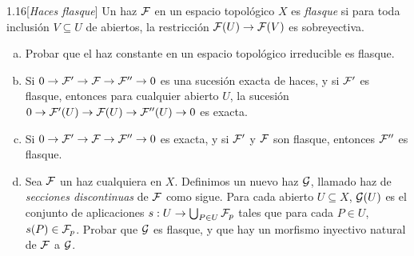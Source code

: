 \documentclass[twoside]{article}
\begin{document}
\newpage

\begin{ejercicio}{1.16}[\emph{Haces flasque}]
Un haz $\mathcal{F}$ en un espacio topológico $X$ es \emph{flasque} si para toda inclusión $V\subseteq U$ de abiertos, la restricción $\mathcal{F}(U)\to\mathcal{F}(V)$ es sobreyectiva.
\begin{enumerate}[(a)]
\item Probar que el haz constante en un espacio topológico irreducible es flasque.
\item Si $0\to\mathcal{F}'\to\mathcal{F}\to\mathcal{F}''\to 0$ es una sucesión exacta de haces, y si $\mathcal{F}'$ es flasque, entonces para cualquier abierto $U$, la sucesión $0\to\mathcal{F}'(U)\to\mathcal{F}(U)\to\mathcal{F}''(U)\to 0$ es exacta. 
\item Si $0\to\mathcal{F}'\to\mathcal{F}\to\mathcal{F}''\to 0$ es exacta, y si $\mathcal{F}'$ y $\mathcal{F}$ son flasque, entonces $\mathcal{F}''$ es flasque. 
\item Sea $\mathcal{F}$ un haz cualquiera en $X$. Definimos un nuevo haz $\mathcal{G}$, llamado haz de \emph{secciones discontinuas} de $\mathcal{F}$ como sigue. Para cada abierto $U\subseteq X$, $\mathcal{G}(U)$ es el conjunto de aplicaciones $s:U\to \bigcup_{P\in U}\mathcal{F}_p$ tales que para cada $P\in U$, $s(P)\in \mathcal{F}_p$. Probar que $\mathcal{G}$ es flasque, y que hay un morfismo inyectivo natural de $\mathcal{F}$ a $\mathcal{G}$. 
\end{enumerate} 
\end{ejercicio}
\end{document}
